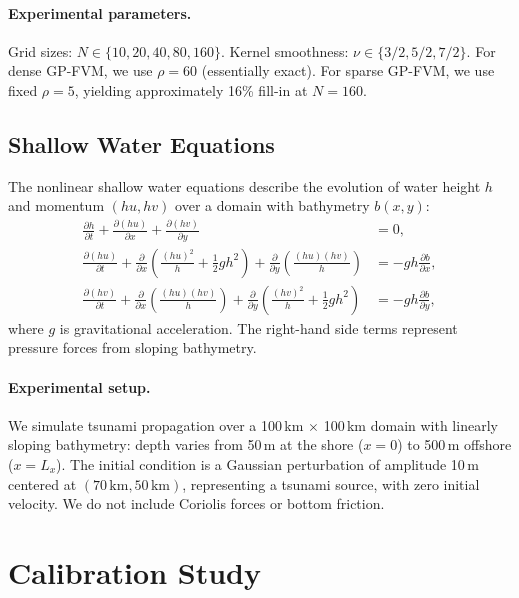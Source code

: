 \documentclass{article}
\theoremstyle{plain}
\theoremstyle{definition}
\theoremstyle{remark}
\begin{document}
\paragraph{Experimental parameters.}
Grid sizes: $N \in \{10, 20, 40, 80, 160\}$.
Kernel smoothness: $\nu \in \{3/2, 5/2, 7/2\}$.
For dense GP-FVM, we use $\rho = 60$ (essentially exact).
For sparse GP-FVM, we use fixed $\rho = 5$, yielding approximately 16\% fill-in at $N = 160$.

\subsection{Shallow Water Equations}
\label{app:swe}

The nonlinear shallow water equations describe the evolution of water height $h$ and momentum $(hu, hv)$ over a domain with bathymetry $b(x,y)$:
\begin{align}
  \frac{\partial h}{\partial t} + \frac{\partial (hu)}{\partial x} + \frac{\partial (hv)}{\partial y}                                                                        & = 0, \label{eq:swe-mass}                                \\
  \frac{\partial (hu)}{\partial t} + \frac{\partial}{\partial x}\left(\frac{(hu)^2}{h} + \frac{1}{2}gh^2\right) + \frac{\partial}{\partial y}\left(\frac{(hu)(hv)}{h}\right) & = -gh\frac{\partial b}{\partial x}, \label{eq:swe-xmom} \\
  \frac{\partial (hv)}{\partial t} + \frac{\partial}{\partial x}\left(\frac{(hu)(hv)}{h}\right) + \frac{\partial}{\partial y}\left(\frac{(hv)^2}{h} + \frac{1}{2}gh^2\right) & = -gh\frac{\partial b}{\partial y}, \label{eq:swe-ymom}
\end{align}
where $g$ is gravitational acceleration. The right-hand side terms represent pressure forces from sloping bathymetry.

\paragraph{Experimental setup.}
We simulate tsunami propagation over a 100\,km $\times$ 100\,km domain with linearly sloping bathymetry: depth varies from 50\,m at the shore ($x=0$) to 500\,m offshore ($x=L_x$).
The initial condition is a Gaussian perturbation of amplitude 10\,m centered at $(70\,\text{km}, 50\,\text{km})$, representing a tsunami source, with zero initial velocity.
We do not include Coriolis forces or bottom friction.

\section{Calibration Study}
\label{app:calibration}
\end{document}
